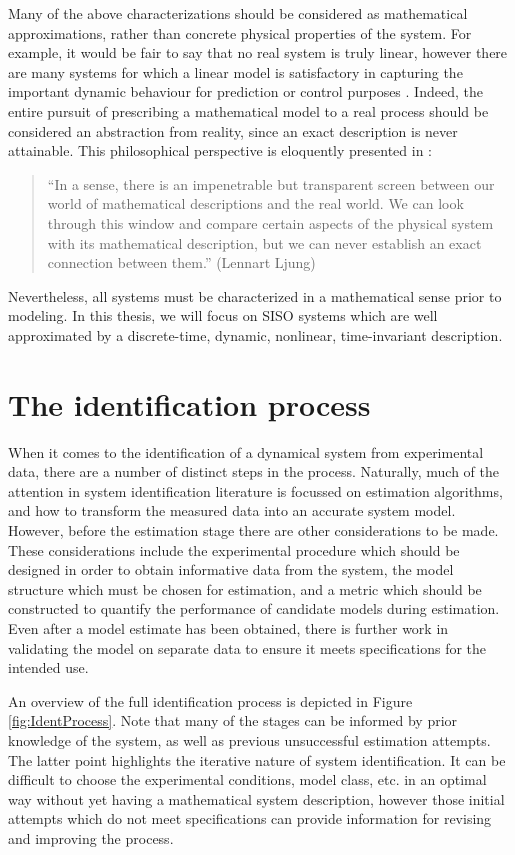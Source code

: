 Many of the above characterizations should be considered as mathematical approximations, rather than concrete physical properties of the system. For example, it would be fair to say that no real system is truly linear, however there are many systems for which a linear model is satisfactory in capturing the important dynamic behaviour for prediction or control purposes \cite{Pintelon2012}. Indeed, the entire pursuit of prescribing a mathematical model to a real process should be considered an abstraction from reality, since an exact description is never attainable. This philosophical perspective is eloquently presented in \cite{Ljung1987}:
\begin{quote}
``In a sense, there is an impenetrable but transparent screen between our world of mathematical descriptions and the real world. We can look through this window and compare certain aspects of the physical system with its mathematical description, but we can never establish an exact connection between them.'' \hfill (Lennart Ljung)
\end{quote} 

Nevertheless, all systems must be characterized in a mathematical sense prior to modeling. In this thesis, we will focus on SISO systems which are well approximated by a discrete-time, dynamic, nonlinear, time-invariant description.

\section{The identification process}

When it comes to the identification of a dynamical system from experimental data, there are a number of distinct steps in the process. Naturally, much of the attention in system identification literature is focussed on estimation algorithms, and how to transform the measured data into an accurate system model. However, before the estimation stage there are other considerations to be made. These considerations include the experimental procedure which should be designed in order to obtain informative data from the system, the model structure which must be chosen for estimation, and a metric which should be constructed to quantify the performance of candidate models during estimation. Even after a model estimate has been obtained, there is further work in validating the model on separate data to ensure it meets specifications for the intended use.

An overview of the full identification process is depicted in Figure \ref{fig:IdentProcess}. Note that many of the stages can be informed by prior knowledge of the system, as well as previous unsuccessful estimation attempts. The latter point highlights the iterative nature of system identification. It can be difficult to choose the experimental conditions, model class, etc. in an optimal way without yet having a mathematical system description, however those initial attempts which do not meet specifications can provide information for revising and improving the process. 

